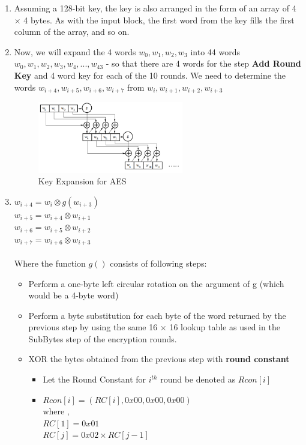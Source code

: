 \documentclass[a4paper]{report} %
\begin{document}
\begin{enumerate}
    \item Assuming a 128-bit key, the key is also arranged in the form of an array of 4 × 4 bytes. As with the input block, the first word from the key fills the first column of the array, and so on.
    \item Now, we will expand the 4 words $w_0, w_1, w_2, w_3$ into 44 words $w_0, w_1, w_2, w_3, w_4, ... , w_{43}$ - so that there are 4 words for the step \textbf{Add Round Key} and 4 word key for each of the 10 rounds. We need to determine the words $w_{i+4}, w_{i+5},  w_{i+6},  w_{i+7}$ from $w_i, w_{i+1}, w_{i+2}, w_{i+3}$ \\
    
    \begin{figure}[ht]
    \centering
    \includegraphics[width=0.6\textwidth]{images/KeyExpansion_AES.PNG}
    \caption{Key Expansion for AES}
    \end{figure}
    \clearpage
    
    \item $w_{i+4} = w_i \otimes g(w_{i+3})$\\ 
    $w_{i+5} = w_{i+4} \otimes w_{i+1}$\\
    $w_{i+6} = w_{i+5} \otimes w_{i+2}$\\
    $w_{i+7} = w_{i+6} \otimes w_{i+3}$\\\\
    Where the function $g()$ consists of following steps:  \begin{itemize}
        \item Perform a one-byte left circular rotation on the argument of g  (which would be a 4-byte word) 
        \item Perform a byte substitution for each byte of the word returned by the previous step by using the same 16 × 16 lookup table as used in the SubBytes step of the encryption rounds.
        \item XOR the bytes obtained from the previous step with \textbf{round constant} 
        \begin{itemize}
            \item Let the Round Constant for $i^{th}$ round be denoted as $Rcon[i]$
            \item $Rcon[i] = (RC[i], 0x00, 0x00, 0x00)$\\
            where , \\ 
            $RC[1] = 0x01$\\
            $RC[j] = 0x02 \times RC[j-1]$
        \end{itemize}
    \end{itemize}
\end{enumerate}
\end{document}
